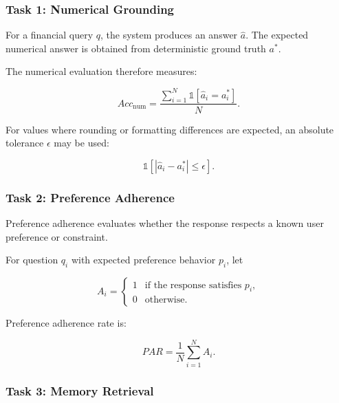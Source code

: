 \documentclass[conference]{IEEEtran}
\begin{document}
    \subsubsection{Task 1: Numerical Grounding}
    
    For a financial query $q$, the system produces an answer $\hat{a}$.
    The expected numerical answer is obtained from deterministic ground
    truth $a^*$.
    
    The numerical evaluation therefore measures:
    
    \begin{equation}
    Acc_{\mathrm{num}}
    =
    \frac{
    \sum_{i=1}^{N}
    \mathbb{1}[\hat{a}_i = a_i^*]
    }{
    N
    }.
    \end{equation}
    
    For values where rounding or formatting differences are expected, an
    absolute tolerance $\epsilon$ may be used:
    
    \begin{equation}
    \mathbb{1}
    [
    |\hat{a}_i-a_i^*| \leq \epsilon
    ].
    \end{equation}
    
    \subsubsection{Task 2: Preference Adherence}
    
    Preference adherence evaluates whether the response respects a known
    user preference or constraint.
    
    For question $q_i$ with expected preference behavior $p_i$, let
    
    \begin{equation}
    A_i =
    \begin{cases}
    1 & \text{if the response satisfies } p_i,\\
    0 & \text{otherwise}.
    \end{cases}
    \end{equation}
    
    Preference adherence rate is:
    
    \begin{equation}
    PAR =
    \frac{1}{N}
    \sum_{i=1}^{N} A_i.
    \end{equation}
    
    \subsubsection{Task 3: Memory Retrieval}
    
\end{document}

